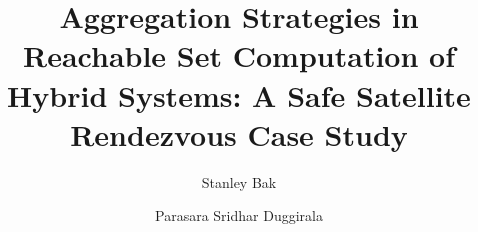 \documentclass[runningheads]{llncs}
\begin{document}
%
\title{Aggregation Strategies in Reachable Set Computation of Hybrid Systems: A Safe Satellite Rendezvous Case Study}
%
%
\author{Stanley Bak \and
Parasara Sridhar Duggirala}
%
% 
%
%
\maketitle              %
%
\end{document}
